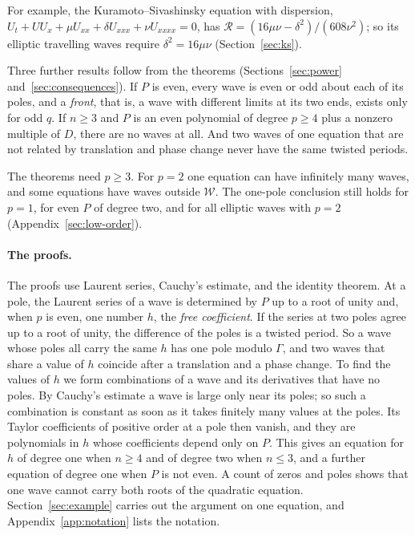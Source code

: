 \documentclass[11pt]{article}
\theoremstyle{definition}
\theoremstyle{remark}
\numberwithin{equation}{section}
\newcommand{\Wclass}{\mathcal W}
\begin{document}
For example, the Kuramoto--Sivashinsky equation with dispersion,
\(U_t+UU_x+\mu U_{xx}+\delta U_{xxx}+\nu U_{xxxx}=0\), has
\(\mathcal R=(16\mu\nu-\delta^2)/(608\nu^2)\); so its elliptic
travelling waves require \(\delta^2=16\mu\nu\)
(Section~\ref{sec:ks}).

Three further results follow from the theorems
(Sections~\ref{sec:power} and~\ref{sec:consequences}). If \(P\) is
even, every wave is even or odd about each of its poles, and a
\emph{front}, that is, a wave with different limits at its two ends,
exists only for odd \(q\). If \(n\ge3\) and \(P\) is an even polynomial of degree
\(p\ge4\) plus a nonzero multiple of \(D\), there are no waves at all.
And two waves of one equation that are not related by translation and
phase change never have the same twisted periods.

The theorems need \(p\ge3\). For \(p=2\) one equation can have
infinitely many waves, and some equations have waves outside
\(\Wclass\). The one-pole conclusion still holds for \(p=1\),
for even \(P\) of degree two, and for all elliptic waves with \(p=2\)
(Appendix~\ref{sec:low-order}).

\paragraph{The proofs.} The proofs use Laurent series, Cauchy's
estimate, and the identity theorem. At a pole, the Laurent series of a
wave is determined by \(P\) up to a root of unity and, when \(p\) is
even, one number \(h\), the \emph{free coefficient}. If the series at
two poles agree up to a root of unity, the difference of the poles is a
twisted period. So a wave whose poles all carry the same \(h\) has one
pole modulo \(\Gamma\), and two waves that share a value of \(h\)
coincide after a translation and a phase change. To find the values of
\(h\) we form combinations of a wave and its derivatives that have no
poles. By Cauchy's estimate a wave is large only near its poles; so
such a combination is constant as soon as it takes finitely many
values at the poles. Its Taylor coefficients of positive order at a
pole then vanish, and they are polynomials in \(h\) whose coefficients
depend only on \(P\). This gives an equation for \(h\) of degree one
when \(n\ge4\) and of degree two when \(n\le3\), and a further equation
of degree one when \(P\) is not even. A count of zeros and poles shows
that one wave cannot carry both roots of the quadratic equation.
Section~\ref{sec:example} carries out the argument on one equation, and
Appendix~\ref{app:notation} lists the notation.
\end{document}
